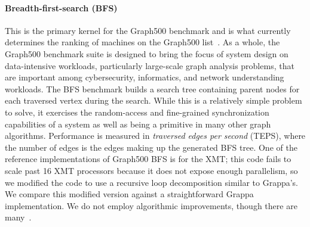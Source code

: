 
\paragraph{Breadth-first-search (BFS)}
This is the primary kernel for the Graph500 benchmark and is what
currently determines the ranking of machines on the Graph500
list~\cite{graph500list}. As a whole, the Graph500 benchmark suite is
designed to bring the focus of system design on data-intensive
workloads, particularly large-scale graph analysis problems, that are
important among cybersecurity, informatics, and network understanding
workloads. The BFS benchmark builds a search tree containing parent
nodes for each traversed vertex during the search.  While this is a
relatively simple problem to solve, it exercises the random-access and
fine-grained synchronization capabilities of a system as well as being
a primitive in many other graph algorithms. Performance is measured in
\emph{traversed edges per second} (TEPS), where the number of edges is
the edges making up the generated BFS tree. One of the reference
implementations of Graph500 BFS is for the XMT; this code fails to
scale past 16 XMT processors because it does not expose enough
parallelism, so we modified the code to use a recursive loop
decomposition similar to Grappa's. We compare this modified version
against a straightforward Grappa implementation. We do not employ
algorithmic improvements, though there are
many~\cite{Beamer:Graph500,Yoo:FixedPointGraph500}.

